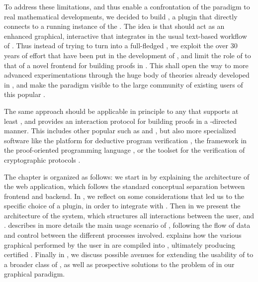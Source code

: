To address these limitations, and thus enable a confrontation of the 
paradigm to real mathematical developments, we decided to build ,
a  plugin that directly connects  to a running instance of
the   \cite{coq-actema}. The idea is that
 should act as an enhanced graphical, interactive 
that integrates in the usual text-based workflow of . Thus
instead of trying to turn  into a full-fledged , we exploit
the over 30 years of effort that have been put in the development of ,
and limit the role of  to that of a novel frontend for building
proofs in . This shall open the way to more advanced experimentations
through the huge body of theories already developed in , and make the
 paradigm visible to the large community of existing users of this
popular .

\begin{remark}
  The same approach should be applicable in principle to any  that
  supports at least , and provides an interaction protocol for building
  proofs in a -directed manner. This includes other popular 
  such as  and , but also more specialized software like
  the  platform for deductive program verification
  \cite{boogie11why3}, the  framework in the proof-oriented
  programming language  \cite{martínez2019metaf}, or the
   toolset for the verification of cryptographic protocols
  \cite{Barthe2014}.
\end{remark}

The chapter is organized as follows: we start in  by explaining
the architecture of the  web application, which follows the standard
conceptual separation between frontend and backend. In , we
reflect on some considerations that led us to the specific choice of a 
plugin, in order to integrate  with . Then in
 we present the architecture of the  system,
which structures all interactions between the user,  and .
 describes in more details the main usage scenario of
, following the flow of data and control between the different
processes involved.  explains how the various graphical
 performed by the user in  are compiled into 
, ultimately producing certified . Finally in
, we discuss possible avenues for extending the usability
of  to a broader class of  , as well as
prospective solutions to the problem of  in our graphical
paradigm.


